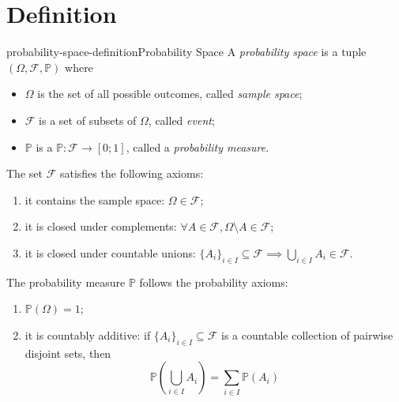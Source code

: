 \documentclass[preview]{standalone}
\begin{document}
\genpage

% 

\section{Definition}

\begin{snippetdefinition}{probability-space-definition}{Probability Space}
    A \textit{probability space} is a tuple \((\Omega, \mathcal{F}, \mathbb{P})\)
    where
    \begin{itemize}
        \item \(\Omega\) is the set of all possible outcomes, called \textit{sample space};
        \item \(\mathcal{F}\) is a set of subsets of \(\Omega\), called \textit{event};
        \item \(\mathbb{P}\) is a \function \(\mathbb{P}\colon \mathcal{F} \to [0;1]\), called a \textit{probability measure}. 
    \end{itemize}
    The set \(\mathcal{F}\) satisfies the following axioms:
    \begin{enumerate}
        \item it contains the sample space: \(\Omega \in \mathcal{F}\);
        \item it is closed under complements: \(\forall A \in \mathcal{F}, \Omega \setminus A \in \mathcal{F}\);
        \item it is closed under countable unions: \({\{A_i\}}_{i \in I} \subseteq \mathcal{F} \implies \bigcup_{i \in I}A_i \in \mathcal{F}\).
    \end{enumerate}
    The probability measure \(\mathbb{P}\) follows the probability axioms:
    \begin{enumerate}
        \item \(\mathbb{P}(\Omega) = 1\);
        \item it is countably additive: if \({\{A_i\}}_{i \in I} \subseteq \mathcal{F}\)
        is a countable collection of pairwise disjoint sets, then
        \[
            \mathbb{P}\left(\bigcup_{i \in I}A_i\right) = \sum_{i \in I} \mathbb{P}(A_i)
        \]
    \end{enumerate}
\end{snippetdefinition}
\end{document}
